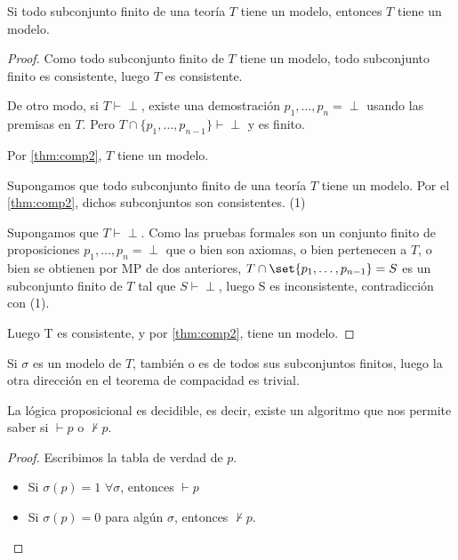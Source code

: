 \begin{theorem}
	Si todo subconjunto finito de una teoría $T$ tiene un modelo, entonces $T$ tiene un modelo.
\end{theorem}
\begin{proof}
	Como todo subconjunto finito de $T$ tiene un modelo, todo subconjunto finito es consistente, luego $T$ es consistente.

	De otro modo, si $T\vdash \perp$, existe una demostración $p_1, \hdots, p_n = \perp$ usando las premisas en $T$. Pero $T\cap\{p_1,\hdots,p_{n-1}\}\vdash \perp$ y es finito.

	Por \ref{thm:comp2}, $T$ tiene un modelo.


Supongamos que todo subconjunto finito de una teoría $T$ tiene un modelo. Por el \ref{thm:comp2}, dichos subconjuntos son consistentes. (1)

Supongamos que $T\vdash \perp$. Como las pruebas formales son un conjunto finito de proposiciones $p_1, \hdots, p_n = \perp$ que o bien son axiomas, o bien pertenecen a $T$, o bien se obtienen por MP de dos anteriores, $T \cap \set{p_1, \hdots, p_{n-1} } = S$ es un subconjunto finito de $T$ tal que $S \vdash \perp$, luego S es inconsistente, contradicción con (1).

Luego T es consistente, y por \ref{thm:comp2}, tiene un modelo.
\end{proof}

\begin{obs}
	Si $\sigma$ es un modelo de $T$, también o es de todos sus subconjuntos finitos, luego la otra dirección en el teorema de compacidad es trivial.
\end{obs}

\begin{theorem}
	La lógica proposicional es decidible, es decir, existe un algoritmo que nos permite saber si $\vdash p$ o $\nvdash p$.
\end{theorem}
\begin{proof}
	Escribimos la tabla de verdad de $p$.
	\begin{itemize}
		\item Si $\sigma(p) = 1$ $\forall\sigma$, entonces $\vdash p$
		\item Si $\sigma(p) = 0$ para algún $\sigma$, entonces $\nvdash p$.
	\end{itemize}
\end{proof}
